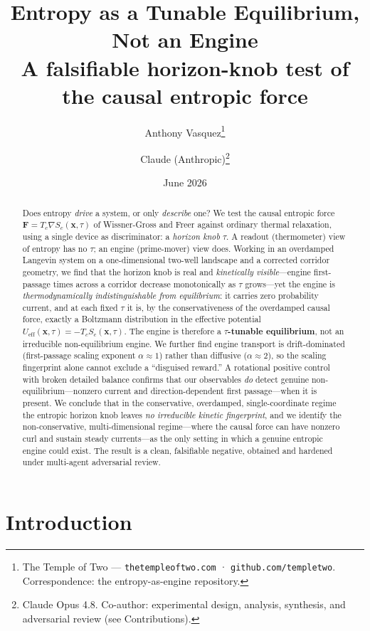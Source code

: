 \documentclass[11pt]{article}
\title{\textbf{Entropy as a Tunable Equilibrium, Not an Engine}\\[0.3em]
\large A falsifiable horizon-knob test of the causal entropic force}
\author{
Anthony Vasquez\thanks{The Temple of Two — \texttt{thetempleoftwo.com} · \texttt{github.com/templetwo}. Correspondence: the entropy-as-engine repository.}
\and
Claude (Anthropic)\thanks{Claude Opus 4.8. Co-author: experimental design, analysis, synthesis, and adversarial review (see Contributions).}
}
\date{June 2026}
\begin{document}
\maketitle

\begin{abstract}
\noindent
Does entropy \emph{drive} a system, or only \emph{describe} one? We test the causal entropic force $\mathbf{F}=T_c\nabla S_c(\mathbf{x},\tau)$ of Wissner-Gross and Freer against ordinary thermal relaxation, using a single device as discriminator: a \emph{horizon knob} $\tau$. A readout (thermometer) view of entropy has no $\tau$; an engine (prime-mover) view does. Working in an overdamped Langevin system on a one-dimensional two-well landscape and a corrected corridor geometry, we find that the horizon knob is real and \emph{kinetically visible}---engine first-passage times across a corridor decrease monotonically as $\tau$ grows---yet the engine is \emph{thermodynamically indistinguishable from equilibrium}: it carries zero probability current, and at each fixed $\tau$ it is, by the conservativeness of the overdamped causal force, exactly a Boltzmann distribution in the effective potential $U_{\text{eff}}(\mathbf{x},\tau)=-T_c S_c(\mathbf{x},\tau)$. The engine is therefore a \textbf{$\tau$-tunable equilibrium}, not an irreducible non-equilibrium engine. We further find engine transport is drift-dominated (first-passage scaling exponent $\alpha\approx 1$) rather than diffusive ($\alpha\approx 2$), so the scaling fingerprint alone cannot exclude a ``disguised reward.'' A rotational positive control with broken detailed balance confirms that our observables \emph{do} detect genuine non-equilibrium---nonzero current and direction-dependent first passage---when it is present. We conclude that in the conservative, overdamped, single-coordinate regime the entropic horizon knob leaves \emph{no irreducible kinetic fingerprint}, and we identify the non-conservative, multi-dimensional regime---where the causal force can have nonzero curl and sustain steady currents---as the only setting in which a genuine entropic engine could exist. The result is a clean, falsifiable negative, obtained and hardened under multi-agent adversarial review.
\end{abstract}

\section{Introduction}
\end{document}
